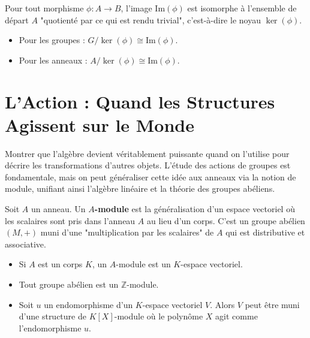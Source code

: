 \begin{theorem}
    Pour tout morphisme $\phi: A \to B$, l'image $\mathrm{Im}(\phi)$ est isomorphe à l'ensemble de départ $A$ "quotienté par ce qui est rendu trivial", c'est-à-dire le noyau $\ker(\phi)$.
    \begin{itemize}
        \item Pour les groupes : $G/\ker(\phi) \cong \mathrm{Im}(\phi)$.
        \item Pour les anneaux : $A/\ker(\phi) \cong \mathrm{Im}(\phi)$.
    \end{itemize}
\end{theorem}

\section{L'Action : Quand les Structures Agissent sur le Monde}

\begin{objectif}
    Montrer que l'algèbre devient véritablement puissante quand on l'utilise pour décrire les transformations d'autres objets. L'étude des actions de groupes est fondamentale, mais on peut généraliser cette idée aux anneaux via la notion de module, unifiant ainsi l'algèbre linéaire et la théorie des groupes abéliens.
\end{objectif}

\begin{definition}
    Soit $A$ un anneau. Un \textbf{$A$-module} est la généralisation d'un espace vectoriel où les scalaires sont pris dans l'anneau $A$ au lieu d'un corps. C'est un groupe abélien $(M,+)$ muni d'une "multiplication par les scalaires" de $A$ qui est distributive et associative.
\end{definition}

\begin{example}
    \begin{itemize}
        \item Si $A$ est un corps $K$, un $A$-module est un $K$-espace vectoriel.
        \item Tout groupe abélien est un $\mathbb{Z}$-module.
        \item Soit $u$ un endomorphisme d'un $K$-espace vectoriel $V$. Alors $V$ peut être muni d'une structure de $K[X]$-module où le polynôme $X$ agit comme l'endomorphisme $u$.
    \end{itemize}
\end{example}

